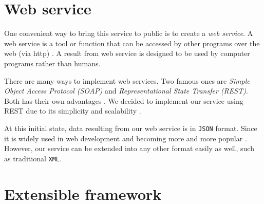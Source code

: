 %
%
%
%
%
%

\section{Web service}

One convenient way to bring this service to public is to create a \emph{web service}.
A web service is a tool or function that can be accessed by other programs
over the web (via http) \cite{ws1}. A result from web service is designed
to be used by computer programs rather than humans.

There are many ways to implement web services. Two famous ones are
\emph{Simple Object Access Protocol (SOAP)} and
\emph{Representational State Transfer (REST)}.
Both has their own advantages \cite{ws2}. We decided to implement
our service using REST due to its simplicity and scalability \cite{ws3}\cite{ws4}.

At this initial state, data resulting from our web service
is in \texttt{JSON} \cite{json} format. Since it is widely used in web development
and becoming more and more popular \cite{rest}. However, our service can be extended
into any other format easily as well, such as traditional \texttt{XML}.

\section{Extensible framework}
